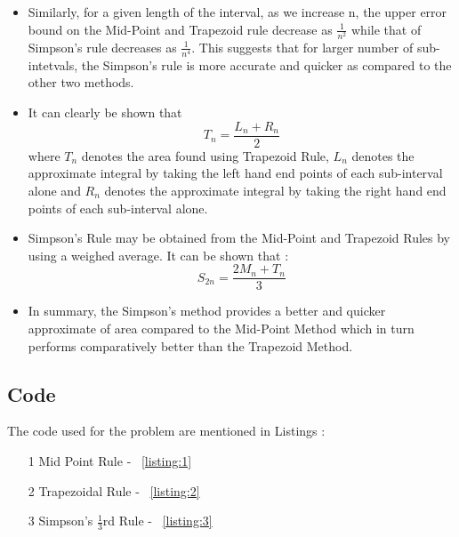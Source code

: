 \documentclass[titlepage, 11pt]{article}
\begin{document}
\begin{itemize}
    \item Similarly, for a given length of the interval, as we increase n, the upper error bound on the Mid-Point and Trapezoid rule decrease as $\frac{1}{n^2}$ while that of Simpson's rule decreases as $\frac{1}{n^4}$. This suggests that for larger number of sub-intetvals, the Simpson's rule is more accurate and quicker as compared to the other two methods.
    \item It can clearly be shown that 
    \begin{equation}
        T_n = \frac{L_n+R_n}{2}
    \end{equation}
    where $T_n$ denotes the area found using Trapezoid Rule, $L_n$ denotes the approximate integral by taking the left hand end points of each sub-interval alone and $R_n$ denotes the approximate integral by taking the right hand end points of each sub-interval alone.
    \item Simpson's Rule may be obtained from the Mid-Point and Trapezoid Rules by using a weighed average. It can be shown that :
    \begin{equation}
        S_{2n} = \frac{2M_n+T_n}{3}
    \end{equation}
    \item In summary, the Simpson's method provides a better and quicker approximate of area compared to the Mid-Point Method which in turn performs comparatively better than the Trapezoid Method. 
\end{itemize}


\subsection{Code}
The code used for the problem are mentioned in Listings : \begin{itemize}
    \item [1] Mid Point Rule - ~\ref{listing:1}
    \item [2] Trapezoidal Rule - ~\ref{listing:2}
    \item [3] Simpson's $\frac{1}{3}$rd Rule - ~\ref{listing:3}
\end{itemize}

\inputminted[breaklines,
 mathescape,
 linenos,
 numbersep=5pt,
 frame=single,
 numbersep=5pt,
 xleftmargin=0pt]{c}{P1MP.c}
\label{listing:1}
\inputminted[breaklines,
 mathescape,
 linenos,
 numbersep=5pt,
 frame=single,
 numbersep=5pt,
 xleftmargin=0pt]{c}{P1TP.c}
\label{listing:2}
\inputminted[breaklines,
 mathescape,
 linenos,
 numbersep=5pt,
 frame=single,
 numbersep=5pt,
 xleftmargin=0pt]{c}{P1SR.c}
\label{listing:3}
\end{document}
